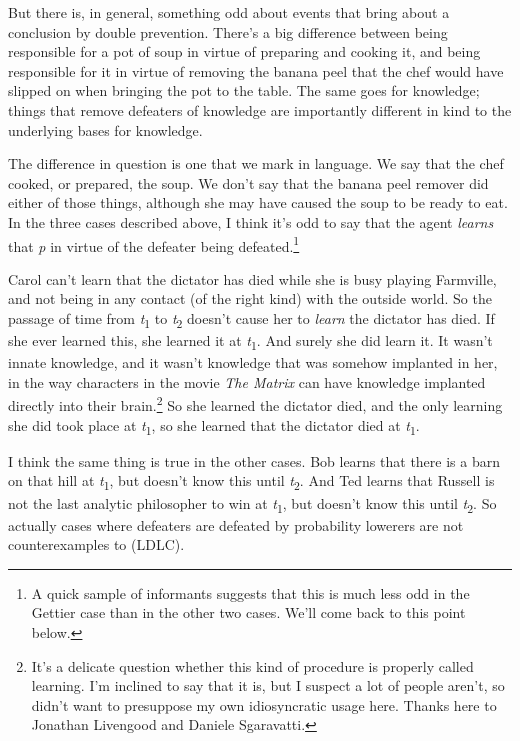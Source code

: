 \documentclass[
  10pt,
  letterpaper,
  DIV=11,
  numbers=noendperiod,
  twoside]{scrartcl}
\begin{document}
But there is, in general, something odd about events that bring about a
conclusion by double prevention. There's a big difference between being
responsible for a pot of soup in virtue of preparing and cooking it, and
being responsible for it in virtue of removing the banana peel that the
chef would have slipped on when bringing the pot to the table. The same
goes for knowledge; things that remove defeaters of knowledge are
importantly different in kind to the underlying bases for knowledge.

The difference in question is one that we mark in language. We say that
the chef cooked, or prepared, the soup. We don't say that the banana
peel remover did either of those things, although she may have caused
the soup to be ready to eat. In the three cases described above, I think
it's odd to say that the agent \emph{learns} that \emph{p} in virtue of
the defeater being defeated.\footnote{A quick sample of informants
  suggests that this is much less odd in the Gettier case than in the
  other two cases. We'll come back to this point below.}

Carol can't learn that the dictator has died while she is busy playing
Farmville, and not being in any contact (of the right kind) with the
outside world. So the passage of time from \emph{t}\textsubscript{1} to
\emph{t}\textsubscript{2} doesn't cause her to \emph{learn} the dictator
has died. If she ever learned this, she learned it at
\emph{t}\textsubscript{1}. And surely she did learn it. It wasn't innate
knowledge, and it wasn't knowledge that was somehow implanted in her, in
the way characters in the movie \emph{The Matrix} can have knowledge
implanted directly into their brain.\footnote{It's a delicate question
  whether this kind of procedure is properly called learning. I'm
  inclined to say that it is, but I suspect a lot of people aren't, so
  didn't want to presuppose my own idiosyncratic usage here. Thanks here
  to Jonathan Livengood and Daniele Sgaravatti.} So she learned the
dictator died, and the only learning she did took place at
\emph{t}\textsubscript{1}, so she learned that the dictator died at
\emph{t}\textsubscript{1}.

I think the same thing is true in the other cases. Bob learns that there
is a barn on that hill at \emph{t}\textsubscript{1}, but doesn't know
this until \emph{t}\textsubscript{2}. And Ted learns that Russell is not
the last analytic philosopher to win at \emph{t}\textsubscript{1}, but
doesn't know this until \emph{t}\textsubscript{2}. So actually cases
where defeaters are defeated by probability lowerers are not
counterexamples to (LDLC).
\end{document}
